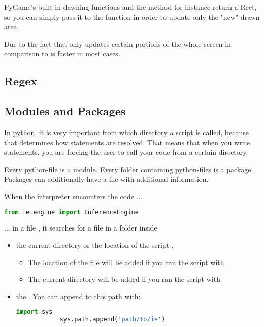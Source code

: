 PyGame's built-in dawning functions and the  method for instance return a Rect, so you can simply pass it to the  function in order to update only the "new" drawn area.

Due to the fact that  only updates certain portions of the whole screen in comparison to  is faster in most cases.


\subsection{Regex}



\subsection{Modules and Packages}

In python, it is very important from which directory a script is called, because that determines how  statements are resolved. That means that when you write  statements, you are forcing the user to call your code from a certain directory.

Every python-file is a module. Every folder containing python-files is a package. Packages can additionally have a  file with additional information.

When the interpreter encounters the code ...
\begin{lstlisting}[language=python]
    from ie.engine import InferenceEngine
\end{lstlisting}
... in a file , it searches for a file  in a folder  inside
\begin{itemize}
    \item the current directory or the location of the script ,
        \begin{itemize}
            \item The location of the  file will be added if you ran the script with 
            \item The current directory will be added if you ran the script with 
        \end{itemize}
    \item the . You can append to this path with:
        \begin{lstlisting}[language=python]
            import sys
            sys.path.append('path/to/ie')
        \end{lstlisting}
\end{itemize}

